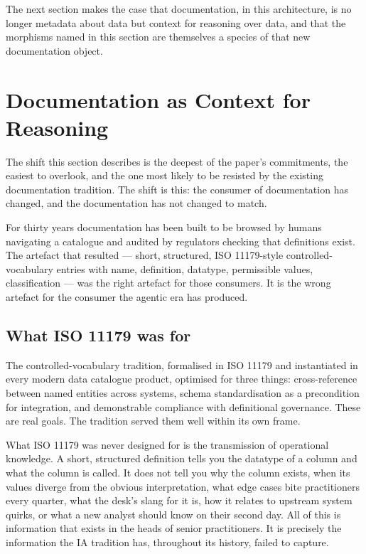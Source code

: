 \documentclass[11pt,a4paper]{article}
\begin{document}
The next section makes the case that documentation, in this architecture, is no longer metadata about data but context for reasoning over data, and that the morphisms named in this section are themselves a species of that new documentation object.

\section{Documentation as Context for Reasoning}
\label{sec:documentation}

The shift this section describes is the deepest of the paper's commitments, the easiest to overlook, and the one most likely to be resisted by the existing documentation tradition. The shift is this: the consumer of documentation has changed, and the documentation has not changed to match.

For thirty years documentation has been built to be browsed by humans navigating a catalogue and audited by regulators checking that definitions exist. The artefact that resulted --- short, structured, ISO 11179-style controlled-vocabulary entries with name, definition, datatype, permissible values, classification --- was the right artefact for those consumers. It is the wrong artefact for the consumer the agentic era has produced.

\subsection{What ISO 11179 was for}

The controlled-vocabulary tradition, formalised in ISO 11179 and instantiated in every modern data catalogue product, optimised for three things: cross-reference between named entities across systems, schema standardisation as a precondition for integration, and demonstrable compliance with definitional governance. These are real goals. The tradition served them well within its own frame.

What ISO 11179 was never designed for is the transmission of operational knowledge. A short, structured definition tells you the datatype of a column and what the column is called. It does not tell you why the column exists, when its values diverge from the obvious interpretation, what edge cases bite practitioners every quarter, what the desk's slang for it is, how it relates to upstream system quirks, or what a new analyst should know on their second day. All of this is information that exists in the heads of senior practitioners. It is precisely the information the IA tradition has, throughout its history, failed to capture.
\end{document}
